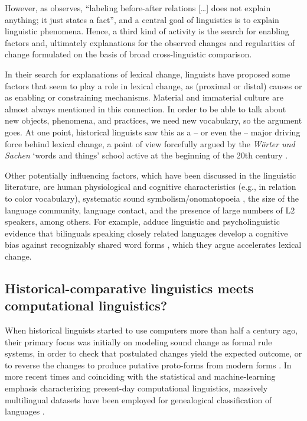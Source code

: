 \documentclass[output=paper]{langsci/langscibook}
\begin{document}
However, as \citet[148]{anttila-1972} observes, ``labeling
before-after relations [\ldots] does not explain anything; it just
states a fact'', and a central goal of linguistics is to explain
linguistic phenomena. Hence, a third kind of activity is the
search for enabling factors and, ultimately explanations for the
observed changes and regularities of change formulated on the basis of
broad cross-linguistic comparison.

In their search for explanations of lexical change, linguists have
proposed some factors that seem to play a role in lexical change,
as (proximal or distal) causes or as enabling or constraining
mechanisms. Material and immaterial culture are almost always
mentioned in this connection. In order to be able to talk about new
objects, phenomena, and practices, we need new vocabulary, so the argument goes. At one point, historical linguists saw this as a -- or even the -- major
driving force behind lexical change, a point of view forcefully
argued by the \emph{Wörter und Sachen} `words and things'
school active at the beginning of the 20th century
\citep{meringer-1912}.

Other potentially influencing factors, which have been discussed in
the linguistic literature, are human physiological and cognitive
characteristics (e.g., in relation to color vocabulary), systematic
sound symbolism/onomatopoeia \citep{erben-johansson-etal-2020}, the
size of the language community, language contact, and the presence of
large numbers of L2 speakers, among others. For example,
\citet{ellison-miceli-2017} adduce linguistic and psycholinguistic
evidence that bilinguals speaking closely related languages develop a
cognitive bias against recognizably shared word forms \citep[termed
  ``doppels'' by][]{ellison-miceli-2017}, which they argue accelerates
lexical change.


\subsection{Historical-comparative linguistics meets computational linguistics?}

When historical linguists started to use computers more than half a
century ago, their primary focus was initially on modeling sound
change as formal rule systems, in order to check that postulated
changes yield the expected outcome, or to reverse the changes to
produce putative proto-forms from modern forms
\citep[e.g.,][]{hewson-1973,hewson-1974,johnson-1985,borin-1988,lowe-mazaudon-1994}. In
more recent times and coinciding with the statistical and
machine-learning emphasis characterizing present-day computational
linguistics, massively multilingual datasets have been employed for
genealogical classification of languages \citep{brown-etal-2008}.
\end{document}
